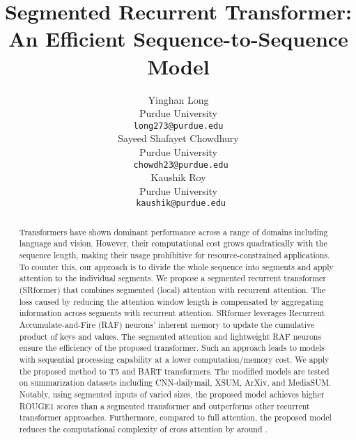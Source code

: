 \documentclass[11pt]{article}
\title{Segmented Recurrent Transformer: An Efficient Sequence-to-Sequence Model}
\author{
Yinghan Long\\
 Purdue University \\
  \texttt{long273@purdue.edu} \\\And
  Sayeed Shafayet Chowdhury \\ 
 Purdue University \\
   \texttt{ chowdh23@purdue.edu}
   \\ \And 
  Kaushik Roy\\
 Purdue University \\
  \texttt{ kaushik@purdue.edu}\\
}
\begin{document}
\maketitle

\begin{abstract}
Transformers have shown dominant performance across a range of domains including language and vision. However, their computational cost grows quadratically with the sequence length, making their usage prohibitive for resource-constrained applications. To counter this, our approach is to divide the whole sequence into segments and apply attention to the individual segments.  We propose a segmented recurrent transformer (SRformer) that combines segmented (local) attention with recurrent attention. The loss caused by reducing the attention window length is compensated by aggregating information across segments with recurrent attention. SRformer leverages Recurrent Accumulate-and-Fire (RAF) neurons' inherent memory to update the cumulative product of keys and values.  The segmented attention and lightweight RAF neurons ensure the efficiency of the proposed transformer. Such an approach leads to models with sequential processing capability at a lower computation/memory cost. We apply the proposed method to T5 and BART transformers. The modified models are tested on summarization datasets including CNN-dailymail, XSUM, ArXiv, and MediaSUM. Notably, using segmented inputs of varied sizes, the proposed model achieves  higher ROUGE1 scores than a segmented transformer and outperforms other recurrent transformer approaches. Furthermore, compared to full attention, the proposed model reduces the computational complexity of cross attention by around .
\end{abstract}
\end{document}
